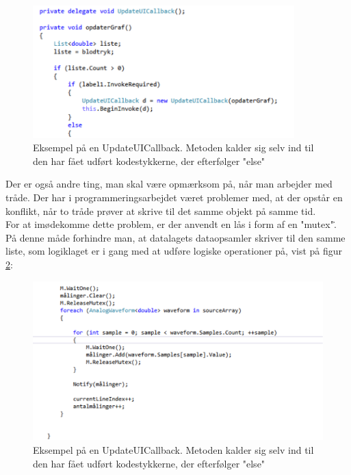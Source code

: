 \begin{figure}[H]
	\centering
	\includegraphics[width=0.9\textwidth]{Figurer/SoftwareImplementering/callback}
	\caption{Eksempel på en UpdateUICallback. Metoden kalder sig selv ind til den har fået udført kodestykkerne, der efterfølger "else"\ }
	\label{callback}
\end{figure}

Der er også andre ting, man skal være opmærksom på, når man arbejder med tråde. Der har i programmeringsarbejdet været problemer med, at der opstår en konflikt, når to tråde prøver at skrive til det samme objekt på samme tid.\\
For at imødekomme dette problem, er der anvendt en lås i form af en "mutex"\.. På denne måde forhindre man, at datalagets dataopsamler skriver til den samme liste, som logiklaget er i gang med at udføre logiske operationer på, vist på figur \ref{mutex}:

\begin{figure}[H]
	\centering
	\includegraphics[width=1.1\textwidth]{Figurer/SoftwareImplementering/mutex}
	\caption{Eksempel på en UpdateUICallback. Metoden kalder sig selv ind til den har fået udført kodestykkerne, der efterfølger "else"\ }
	\label{mutex}
\end{figure}


